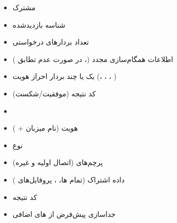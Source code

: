 


\begin{itemize}
\tightlist
\item
   مشترک
\item
  شناسه  بازدیدشده
\item
  تعداد بردارهای درخواستی
\item
  اطلاعات همگام‌سازی مجدد (، در صورت عدم تطابق )
\end{itemize}


\begin{itemize}
\tightlist
\item
  یک یا چند بردار احراز هویت  (، ، ، )
\item
  کد نتیجه (موفقیت/\allowbreak{}شکست)
\end{itemize}


\begin{itemize}
\tightlist
\item
\item
  هویت  (نام میزبان + )
\item
  نوع 
\item
  پرچم‌های  (اتصال اولیه و غیره)
\end{itemize}


\begin{itemize}
\tightlist
\item
  داده اشتراک (تمام ها، ، پروفایل‌های )
\item
  کد نتیجه
\item
  جداسازی  پیش‌فرض از های اضافی
\end{itemize}


